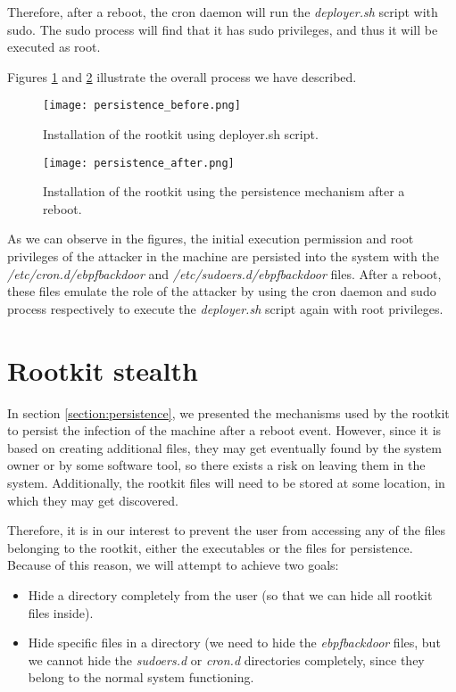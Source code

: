 Therefore, after a reboot, the cron daemon will run the \textit{deployer.sh} script with sudo. The sudo process will find that it has sudo privileges, and thus it will be executed as root.

Figures \ref{fig:persistence_before} and \ref{fig:persistence_after} illustrate the overall process we have described.

\begin{figure}[htbp]
	\centering
	\texttt{[image: persistence\_before.png]}
	\caption{Installation of the rootkit using deployer.sh script.}
	\label{fig:persistence_before}
\end{figure}

\begin{figure}[htbp]
	\centering
	\texttt{[image: persistence\_after.png]}
	\caption{Installation of the rootkit using the persistence mechanism after a reboot.}
	\label{fig:persistence_after}
\end{figure}


As we can observe in the figures, the initial execution permission and root privileges of the attacker in the machine are persisted into the system with the \textit{/etc/cron.d/ebpfbackdoor} and \textit{/etc/sudoers.d/ebpfbackdoor} files. After a reboot, these files emulate the role of the attacker by using the cron daemon and sudo process respectively to execute the \textit{deployer.sh} script again with root privileges.



\section{Rootkit stealth}
In section \ref{section:persistence}, we presented the mechanisms used by the rootkit to persist the infection of the machine after a reboot event. However, since it is based on creating additional files, they may get eventually found by the system owner or by some software tool, so there exists a risk on leaving them in the system. Additionally, the rootkit files will need to be stored at some location, in which they may get discovered.

Therefore, it is in our interest to prevent the user from accessing any of the files belonging to the rootkit, either the executables or the files for persistence. Because of this reason, we will attempt to achieve two goals:
\begin{itemize}
\item Hide a directory completely from the user (so that we can hide all rootkit files inside).
\item Hide specific files in a directory (we need to hide the \textit{ebpfbackdoor} files, but we cannot hide the \textit{sudoers.d} or \textit{cron.d} directories completely, since they belong to the normal system functioning.
\end{itemize}

